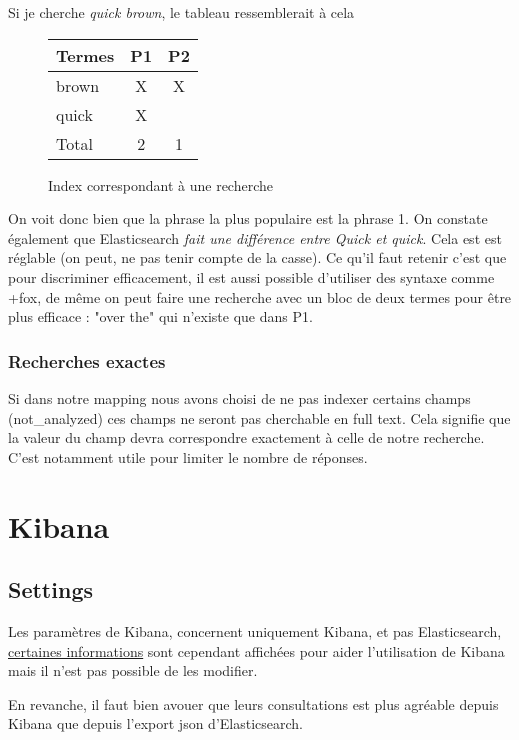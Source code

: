 Si je cherche \emph{quick brown}, le tableau ressemblerait à cela 


\begin{figure}[H]
\center
\begin{tabular}{|l||c|c|}
\hline
\textbf{Termes}   & \textbf{P1}    & \textbf{P2}\\ \hline  
brown   &   X   &  X\\ \hline
quick   &   X   &   \\ \hline \hline
Total   &   2   &  1 \\ \hline
\end{tabular}
\caption{Index correspondant à une recherche}
\end{figure}

On voit donc bien que la phrase la plus populaire est la phrase 1. On constate également
que Elasticsearch \emph{fait une différence entre \emph{Quick} et \emph{quick}}. 
Cela est est réglable (on peut, ne pas tenir compte de la casse).
Ce qu'il faut retenir c'est que pour discriminer efficacement, il est aussi possible
d'utiliser des syntaxe comme +fox, de même on peut faire une recherche avec un bloc
de deux termes pour être plus efficace : "over the" qui n'existe que dans P1.


\subsubsection{Recherches exactes}
Si dans notre mapping nous avons choisi de ne pas indexer certains champs (not\_analyzed)
ces champs ne seront pas cherchable en full text. Cela signifie que la valeur du 
champ devra correspondre exactement à celle de notre recherche. C'est notamment 
utile pour limiter le nombre de réponses.




\section{Kibana}
\subsection{Settings}
\label{subsec:settings}
Les paramètres de Kibana, concernent
uniquement Kibana, et pas Elasticsearch,\hyperref[fig:kibanatuto14]{ certaines informations} 
sont cependant affichées pour aider l'utilisation de Kibana mais il n'est pas possible 
de les modifier.

En revanche, il faut bien avouer que leurs consultations est plus agréable depuis 
Kibana que depuis l'export json d'Elasticsearch.

